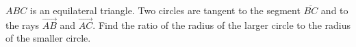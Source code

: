 $ABC$ is an equilateral triangle. Two circles are tangent to the segment $\overline{BC}$ and to the rays $\overrightarrow{AB}$ and $\overrightarrow{AC}$. Find the ratio of the radius of the larger circle to the radius of the smaller circle.
